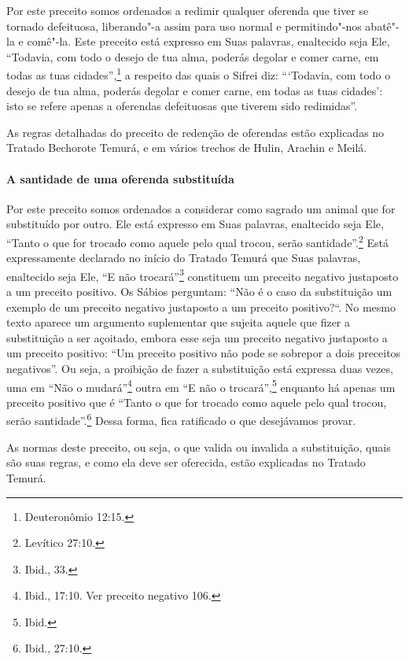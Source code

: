 \begin{multicols}{2}
Por este preceito somos ordenados a redimir qualquer oferenda que tiver
se tornado defeituosa, liberando"-a assim para uso normal e
permitindo"-nos abatê"-la e comê"-la. Este preceito está expresso em Suas
palavras, enaltecido seja Ele, ``Todavia, com todo o desejo de tua alma,
poderás degolar e comer carne, em todas as tuas cidades'',\footnote{Deuteronômio
12:15.} a respeito das quais o Sifrei\starr{} diz: ```Todavia, com todo o desejo
de tua alma, poderás degolar e comer carne, em todas as tuas cidades':
isto se refere apenas a oferendas defeituosas que tiverem sido
redimidas''.

As regras detalhadas do preceito de redenção de oferendas estão
explicadas no Tratado Bechorot\starr e Temurá\starr, e em vários trechos de Hulin\starr,
Arachin\star{} e Meilá\starr.

\paragraph{A santidade de uma oferenda substituída}

Por este preceito somos ordenados a considerar como sagrado um animal
que for substituído por outro. Ele está expresso em Suas palavras,
enaltecido seja Ele, ``Tanto o que for trocado como aquele pelo qual
trocou, serão santidade''.\footnote{Levítico 27:10.} Está expressamente
declarado no início do Tratado Temurá\starr{} que Suas palavras, enaltecido
seja Ele, ``E não trocará''\footnote{Ibid., 33.} constituem um preceito negativo
justaposto a um preceito positivo. Os Sábios perguntam: ``Não é o caso
da substituição um exemplo de um preceito negativo justaposto a um
preceito positivo?``. No mesmo texto aparece um argumento suplementar
que sujeita aquele que fizer a substituição a ser açoitado, embora esse
seja um preceito negativo justaposto a um preceito positivo: ``Um
preceito positivo não pode se sobrepor a dois preceitos negativos''. Ou
seja, a proibição de fazer a substituição está expressa duas vezes, uma
em ``Não o mudará''\footnote{Ibid., 17:10. Ver preceito negativo 106.} outra em ``E
não o trocará'',\footnote{Ibid.} enquanto há apenas um preceito positivo que é
``Tanto o que for trocado como aquele pelo qual trocou, serão
santidade''.\footnote{Ibid., 27:10.} Dessa forma, fica ratificado o que
desejávamos provar.

As normas deste preceito, ou seja, o que valida ou invalida a
substituição, quais são suas regras, e como ela deve ser oferecida,
estão explicadas no Tratado Temurá\starr.


\end{multicols}
